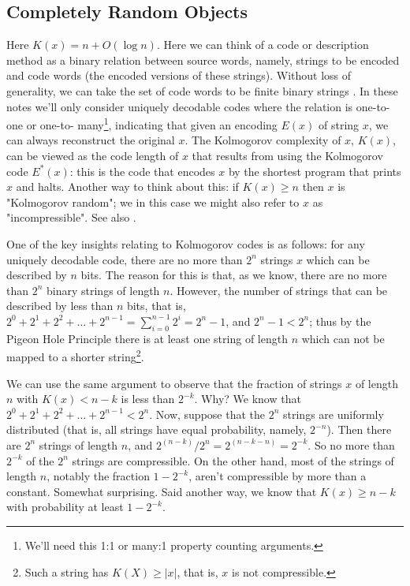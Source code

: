 \documentclass[11pt, oneside]{article}   	%
\begin{document}
\subsection{Completely Random Objects}
Here $K(x) = n + O(\log n)$.  Here we can think of a code or description method as a binary relation between source words, namely, strings to be encoded and code words 
(the encoded versions of these strings). Without loss of generality, we can take the set of code words to be finite binary strings \cite{Cover2006}.  In these notes we'll only consider uniquely 
decodable codes where the relation is one-to-one or one-to- many\footnote{We'll need this 1:1 or many:1 property counting arguments.}, indicating that given an encoding 
$E(x)$ of string $x$, we can always reconstruct the original $x$. The Kolmogorov complexity of $x$, $K(x)$, can be viewed as the code length of $x$ that results from using the 
Kolmogorov code $E^*(x)$: this is the code that encodes $x$ by the shortest program that prints $x$ and halts. Another way to think about this: if $K(x) \geq n$ then $x$ is "Kolmogorov random";
we in this case we might also refer to $x$ as "incompressible". See also \cite{2009arXiv0910.1691J}.

\bigskip
\noindent
One of the key insights relating to Kolmogorov codes is as follows: for any uniquely decodable code, there are no more than $2^n$ strings $x$ which can be described by $n$ bits. 
The reason for this is that, as we know, there are no more than $2^n$ binary strings of length $n$. However,  the number of strings that can be described by less than $n$ bits,
that is, $2^0 + 2^1 + 2^2 + \hdots + 2^{n -1} = \sum\limits_{i = 0}^{n -1} 2^i = 2^n - 1$, and $2^n - 1 < 2^n$; thus by the Pigeon Hole Principle there is at least one string of length 
$n$ which can not be mapped to a shorter string\footnote{Such a string has $K(X) \geq |x|$, that is, $x$ is not compressible.}. 

\bigskip
\noindent
We can use the same argument to observe that  the fraction of strings $x$ of length $n$ with $K(x) < n - k$ is less than $2^{-k}$. Why? We know that
$2^0 + 2^1 + 2^2 + \hdots + 2^{{n -1}} < 2^n$.  Now, suppose that the $2^n$ strings are uniformly distributed (that is, all strings have equal probability,
namely, $2^{-n}$).  Then there are $2^n$ strings of length $n$, and $2^{(n-k)}/2^n = 2^{(n-k-n)} = 2^{-k}$. So no more than $2^{-k}$
of the  $2^n$ strings are compressible.  On the other hand, most of the strings of length $n$, notably the fraction $1-2^{-k}$, aren't compressible 
by more than a constant.  Somewhat surprising. Said another way, we know that  $K(x) \geq n - k $ with probability at least $1 - 2^{-k}$.
\end{document}
